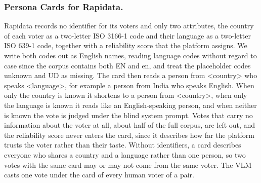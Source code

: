 \documentclass[runningheads]{llncs}
\newcommand{\pt}[1]{{\ttfamily\footnotesize #1}}
\begin{document}
\subsubsection{Persona Cards for Rapidata.} Rapidata records no identifier for its voters and only two attributes, the country of each voter as a two-letter ISO 3166-1 code and their language as a two-letter ISO 639-1 code, together with a reliability score that the platform assigns. We write both codes out as English names, reading language codes without regard to case since the corpus contains both \pt{EN} and \pt{en}, and treat the placeholder codes \pt{unknown} and \pt{UD} as missing. The card then reads \pt{a person from <country> who speaks <language>}, for example \pt{a person from India who speaks English}. When only the country is known it shortens to \pt{a person from <country>}, when only the language is known it reads like \pt{an English-speaking person}, and when neither is known the vote is judged under the blind system prompt. Votes that carry no information about the voter at all, about half of the full corpus, are left out, and the reliability score never enters the card, since it describes how far the platform trusts the voter rather than their taste. Without identifiers, a card describes everyone who shares a country and a language rather than one person, so two votes with the same card may or may not come from the same voter. The VLM casts one vote under the card of every human voter of a pair.
\end{document}
